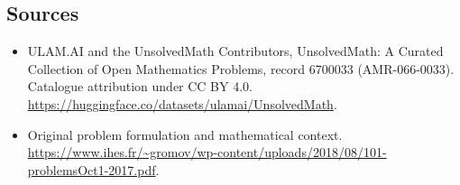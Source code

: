 \documentclass[11pt]{article}
\begin{document}
\subsection{Sources}
\begin{itemize}
\item[\hypertarget{source:6700033:1}{S1}] ULAM.AI and the UnsolvedMath Contributors, UnsolvedMath: A Curated Collection of Open Mathematics Problems, record 6700033 (AMR-066-0033). Catalogue attribution under CC BY 4.0.
\url{https://huggingface.co/datasets/ulamai/UnsolvedMath}.
\item[\hypertarget{source:6700033:2}{S2}] Original problem formulation and mathematical context.
\url{https://www.ihes.fr/~gromov/wp-content/uploads/2018/08/101-problemsOct1-2017.pdf}.
\end{itemize}
\label{end:6700033}
\end{document}
